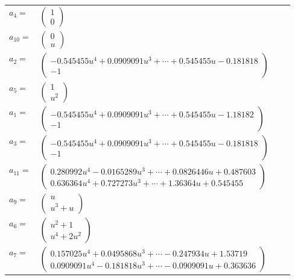 \documentclass[1p]{elsarticle_modified}
\theoremstyle{definition}
\begin{document}
\begin{tabular}{m{7pt} m{180pt} m{7pt} m{180pt} }
\flushright $a_{4}=$&$\begin{pmatrix}1\\0\end{pmatrix}$ \\
\flushright $a_{10}=$&$\begin{pmatrix}0\\u\end{pmatrix}$ \\
\flushright $a_{2}=$&$\begin{pmatrix}-0.545455 u^{4}+0.0909091 u^{3}+\cdots+0.545455 u-0.181818\\-1\end{pmatrix}$ \\
\flushright $a_{5}=$&$\begin{pmatrix}1\\u^2\end{pmatrix}$ \\
\flushright $a_{1}=$&$\begin{pmatrix}-0.545455 u^{4}+0.0909091 u^{3}+\cdots+0.545455 u-1.18182\\-1\end{pmatrix}$ \\
\flushright $a_{3}=$&$\begin{pmatrix}-0.545455 u^{4}+0.0909091 u^{3}+\cdots+0.545455 u-0.181818\\-1\end{pmatrix}$ \\
\flushright $a_{11}=$&$\begin{pmatrix}0.280992 u^{4}-0.0165289 u^{3}+\cdots+0.0826446 u+0.487603\\0.636364 u^{4}+0.727273 u^{3}+\cdots+1.36364 u+0.545455\end{pmatrix}$ \\
\flushright $a_{9}=$&$\begin{pmatrix}u\\u^3+u\end{pmatrix}$ \\
\flushright $a_{6}=$&$\begin{pmatrix}u^2+1\\u^4+2 u^2\end{pmatrix}$ \\
\flushright $a_{7}=$&$\begin{pmatrix}0.157025 u^{4}+0.0495868 u^{3}+\cdots-0.247934 u+1.53719\\0.0909091 u^{4}-0.181818 u^{3}+\cdots-0.0909091 u+0.363636\end{pmatrix}$ \\

\end{tabular}
\end{document}

